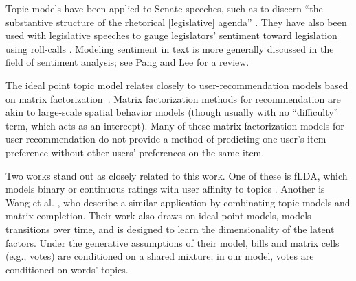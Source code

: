 Topic models have been applied to Senate speeches, such as to discern
``the substantive structure of the rhetorical [legislative] agenda''
\cite{quinn:2006}.  They have also been used with legislative speeches
to gauge legislators' sentiment toward legislation using roll-calls
\cite{thomas:2006}.  Modeling sentiment in text is more generally
discussed in the field of sentiment analysis; see Pang and Lee
\cite{pang:2008} for a review.


The ideal point topic model relates closely to user-recommendation
models based on matrix factorization~\cite{Salakhutdinov:2008a}.
Matrix factorization methods for recommendation are akin to
large-scale spatial behavior models (though usually with no
``difficulty'' term, which acts as an intercept).  Many of these
matrix factorization models for user recommendation do not provide a
method of predicting one user's item preference without other users'
preferences on the same item.

Two works stand out as closely related to this work.  One of these is
fLDA, which models binary or continuous ratings with user affinity to
topics \cite{agarwal:2010}.  Another is Wang et
al. \cite{wang:2010}, who describe a similar application by
combinating topic models and matrix completion.  Their work also draws
on ideal point models, models transitions over time, and is designed
to learn the dimensionality of the latent factors.  Under the
generative assumptions of their model, bills and matrix cells (e.g.,
votes) are conditioned on a shared mixture; in our model, votes are
conditioned on words' topics.





